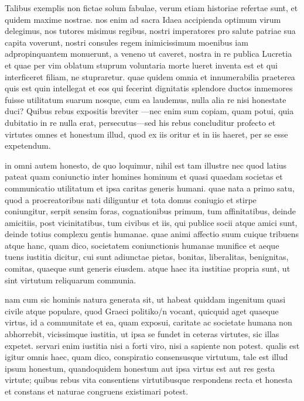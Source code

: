  Talibus exemplis non fictae solum fabulae, verum etiam historiae refertae sunt, et quidem maxime nostrae. nos enim ad sacra Idaea accipienda optimum virum delegimus, nos tutores misimus regibus, nostri imperatores pro salute patriae sua capita voverunt, nostri consules regem inimicissimum moenibus iam adpropinquantem monuerunt, a veneno ut caveret, nostra in re publica Lucretia et quae per vim oblatum stuprum voluntaria morte lueret inventa est et qui interficeret filiam, ne stupraretur. quae quidem omnia et innumerabilia praeterea quis est quin intellegat et eos qui fecerint dignitatis splendore ductos inmemores fuisse utilitatum suarum nosque, cum ea laudemus, nulla alia re nisi honestate duci? Quibus rebus expositis breviter —nec enim sum copiam, quam potui, quia dubitatio in re nulla erat, persecutus—sed his rebus concluditur profecto et virtutes omnes et honestum illud, quod ex iis oritur et in iis haeret, per se esse expetendum.

 in omni autem honesto, de quo loquimur, nihil est tam illustre nec quod latius pateat quam coniunctio inter homines hominum et quasi quaedam societas et communicatio utilitatum et ipsa caritas generis humani. quae nata a primo satu, quod a procreatoribus nati diliguntur et tota domus coniugio et stirpe coniungitur, serpit sensim foras, cognationibus primum, tum affinitatibus, deinde amicitiis, post vicinitatibus, tum civibus et iis, qui publice socii atque amici sunt, deinde totius complexu gentis humanae. quae animi affectio suum cuique tribuens atque hanc, quam dico, societatem coniunctionis humanae munifice et aeque tuens iustitia dicitur, cui sunt adiunctae pietas, bonitas, liberalitas, benignitas, comitas, quaeque sunt generis eiusdem. atque haec ita iustitiae propria sunt, ut sint virtutum reliquarum communia.

 nam cum sic hominis natura generata sit, ut habeat quiddam ingenitum quasi civile atque populare, quod Graeci politiko/n vocant, quicquid aget quaeque virtus, id a communitate et ea, quam exposui, caritate ac societate humana non abhorrebit, vicissimque iustitia, ut ipsa se fundet in ceteras virtutes, sic illas expetet. servari enim iustitia nisi a forti viro, nisi a sapiente non potest. qualis est igitur omnis haec, quam dico, conspiratio consensusque virtutum, tale est illud ipsum honestum, quandoquidem honestum aut ipsa virtus est aut res gesta virtute; quibus rebus vita consentiens virtutibusque respondens recta et honesta et constans et naturae congruens existimari potest.

